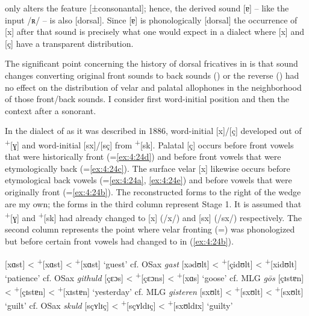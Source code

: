  only alters the feature [±consonantal]; hence, the derived sound [ɐ] -- like the input /ʀ/ -- is also [dorsal]. Since [ɐ] is phonologically [dorsal] the occurrence of [x] after that sound is precisely what one would expect in a dialect where [x] and [ç] have a transparent distribution.

The significant point concerning the history of dorsal fricatives in  is that sound changes converting original front sounds to back sounds () or the reverse () had no effect on the distribution of velar and palatal allophones in the neighborhood of those front/back sounds. I consider first word-initial position and then the context after a sonorant.

In the dialect of  as it was described in 1886, word-initial [x]/[ç] developed out of  \textsuperscript{+}[ɣ] and word-initial [sx]/[sç] from  \textsuperscript{+}[sk]. Palatal [ç] occurs before front vowels that were historically front (=\ref{ex:4:24d}) and before front vowels that were etymologically back (=\ref{ex:4:24c}). The surface velar [x] likewise occurs before etymological back vowels (=\ref{ex:4:24a}, \ref{ex:4:24e}) and before vowels that were originally front (=\ref{ex:4:24b}). The reconstructed forms to the right of the wedge are my own; the forms in the third column represent Stage 1. It is assumed that  \textsuperscript{+}[ɣ] and  \textsuperscript{+}[sk] had already changed to [x] (/x/) and [sx] (/sx/) respectively. The second column represents the point where velar fronting (=) was phonologized but before certain front vowels had changed to  in (\ref{ex:4:24b}).


\ea%
    \label{ex:4:24}
\ea\label{ex:4:24a}  [xɑst]   \tab<  \textsuperscript{+}[xɑst]     \tab<  \textsuperscript{+}[xɑst]     \tab‘guest’      \tab cf. OSax \textit{gast}  
\ex\label{ex:4:24b}  [xədʊlt] \tab<  \textsuperscript{+}[çidʊlt]   \tab<  \textsuperscript{+}[xidʊlt]   \tab‘patience’   \tab cf. OSax \textit{githuld}
\ex\label{ex:4:24c}  [çɛɔs]   \tab<  \textsuperscript{+}[çɛɔns]    \tab<  \textsuperscript{+}[xɑs]      \tab‘goose’      \tab cf. MLG \textit{gōs}
\ex\label{ex:4:24d}  [çɪstɐn] \tab<  \textsuperscript{+}[çɪstɐn]   \tab<  \textsuperscript{+}[xɪstɐn]   \tab‘yesterday’  \tab cf. MLG \textit{gisteren} 
\ex\label{ex:4:24e}  [sxʊlt]  \tab<  \textsuperscript{+}[sxʊlt]    \tab<  \textsuperscript{+}[sxʊlt]    \tab‘guilt’      \tab cf. OSax \textit{skuld} 
\ex\label{ex:4:24f}  [sçʏlɪç] \tab<  \textsuperscript{+}[sçʏldɪç]  \tab<  \textsuperscript{+}[sxʊldɪx]  \tab‘guilty’     \tab     
\z
\z 

